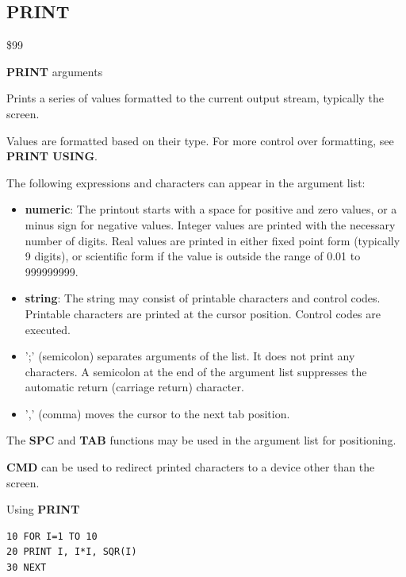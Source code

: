 \subsection{PRINT}
\begin{description}[leftmargin=2cm,style=nextline]
\item [Token:]    \$99

\item [Format:]   {\bf PRINT} arguments

\item [Usage:]    Prints a series of values formatted to the current output stream, typically the screen.

                  Values are formatted based on their type. For more control over formatting, see {\bf PRINT USING}.

                  The following expressions and characters can appear in the argument list:
                  \begin{itemize}
                     \item {\bf numeric}: The printout starts with a space for positive and zero values, or a minus sign for negative values. Integer values are printed with the necessary number of digits. Real values are printed in either fixed point form (typically 9 digits), or scientific form if the value is outside the range of 0.01 to 999999999.
                     \item {\bf string}: The string may consist of printable characters and control codes. Printable characters are printed at the cursor position. Control codes are executed.
                     \item ';' (semicolon) separates arguments of the list. It does not print any characters. A semicolon at the end of the argument list suppresses the automatic return (carriage return) character.
                     \item ',' (comma) moves the cursor to the next tab position.
                 \end{itemize}

\item [Remarks:]  The {\bf SPC} and {\bf TAB} functions may be used in the argument list for positioning.

                  {\bf CMD} can be used to redirect printed characters to a device other than the screen.

\item [Example:]  Using {\bf PRINT}

\begin{tcolorbox}[colback=black,coltext=white]
\verbatimfont{\codefont}
\begin{verbatim}
10 FOR I=1 TO 10
20 PRINT I, I*I, SQR(I)
30 NEXT
\end{verbatim}
\end{tcolorbox}
\end{description}

